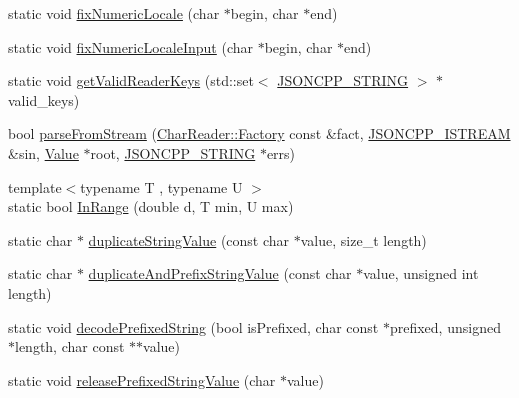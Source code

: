 \begin{DoxyCompactItemize}
\item 
static void \hyperlink{namespaceJson_aa208904144dc7b11ccc28f47c9afab9a_aa208904144dc7b11ccc28f47c9afab9a}{fix\+Numeric\+Locale} (char $\ast$begin, char $\ast$end)
\item 
static void \hyperlink{namespaceJson_ac142c270507391c8d86f35b550d36eb4_ac142c270507391c8d86f35b550d36eb4}{fix\+Numeric\+Locale\+Input} (char $\ast$begin, char $\ast$end)
\item 
static void \hyperlink{namespaceJson_a8c38450840f3d88e9b981ae132f7ad0a_a8c38450840f3d88e9b981ae132f7ad0a}{get\+Valid\+Reader\+Keys} (std\+::set$<$ \hyperlink{json_8h_a1e723f95759de062585bc4a8fd3fa4be_a1e723f95759de062585bc4a8fd3fa4be}{J\+S\+O\+N\+C\+P\+P\+\_\+\+S\+T\+R\+I\+NG} $>$ $\ast$valid\+\_\+keys)
\item 
bool \hyperlink{namespaceJson_a38f903cfdb57a6c4e86a7dcc42f3712c_a38f903cfdb57a6c4e86a7dcc42f3712c}{parse\+From\+Stream} (\hyperlink{classJson_1_1CharReader_1_1Factory}{Char\+Reader\+::\+Factory} const \&fact, \hyperlink{json_8h_a15f2f70b2ce0a2abd0f8112393dbc4de_a15f2f70b2ce0a2abd0f8112393dbc4de}{J\+S\+O\+N\+C\+P\+P\+\_\+\+I\+S\+T\+R\+E\+AM} \&sin, \hyperlink{classJson_1_1Value}{Value} $\ast$root, \hyperlink{json_8h_a1e723f95759de062585bc4a8fd3fa4be_a1e723f95759de062585bc4a8fd3fa4be}{J\+S\+O\+N\+C\+P\+P\+\_\+\+S\+T\+R\+I\+NG} $\ast$errs)
\item 
{\footnotesize template$<$typename T , typename U $>$ }\\static bool \hyperlink{namespaceJson_aff0180507262a244de61b961178d7443_aff0180507262a244de61b961178d7443}{In\+Range} (double d, T min, U max)
\item 
static char $\ast$ \hyperlink{namespaceJson_a678ac3a60cd70ec0fb4c9abfd40eb0c4_a678ac3a60cd70ec0fb4c9abfd40eb0c4}{duplicate\+String\+Value} (const char $\ast$value, size\+\_\+t length)
\item 
static char $\ast$ \hyperlink{namespaceJson_a9795a09a0141d1f12d307c4386aeaee6_a9795a09a0141d1f12d307c4386aeaee6}{duplicate\+And\+Prefix\+String\+Value} (const char $\ast$value, unsigned int length)
\item 
static void \hyperlink{namespaceJson_aad8b4982c1acd164f541fba396ac9fb1_aad8b4982c1acd164f541fba396ac9fb1}{decode\+Prefixed\+String} (bool is\+Prefixed, char const $\ast$prefixed, unsigned $\ast$length, char const $\ast$$\ast$value)
\item 
static void \hyperlink{namespaceJson_a48f4e3ea655e3b4a5d7f892c81f00511_a48f4e3ea655e3b4a5d7f892c81f00511}{release\+Prefixed\+String\+Value} (char $\ast$value)
$$
\end{DoxyCompactItemize}
